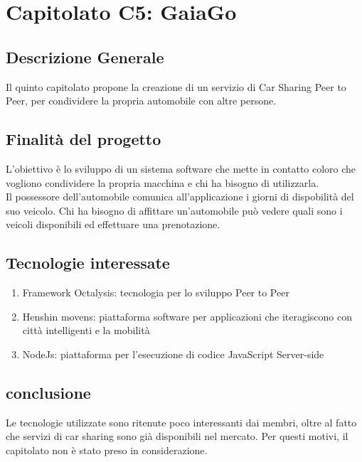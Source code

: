\chapter{Capitolato C5: GaiaGo}
\section{Descrizione Generale}

Il quinto capitolato propone la creazione di un servizio di Car Sharing Peer to Peer, per condividere la propria automobile con altre persone.\\


\section{Finalit\`a del progetto}
L'obiettivo è lo sviluppo di un sistema software che mette in contatto coloro che vogliono condividere la propria macchina e chi ha bisogno di utilizzarla.\\
Il possessore dell'automobile comunica all'applicazione i giorni di dispobilit\`a del suo veicolo.
Chi ha bisogno di affittare un'automobile può vedere quali sono i veicoli disponibili ed effettuare una prenotazione.

\section{Tecnologie interessate}
\begin{enumerate}
\item Framework Octalysis: tecnologia per lo sviluppo Peer to Peer
\item Henshin movens: piattaforma software per applicazioni che iteragiscono con città intelligenti e la mobilità
\item NodeJs: piattaforma per l'esecuzione di codice JavaScript Server-side
\end{enumerate}
\section{conclusione}
Le tecnologie utilizzate sono ritenute poco interessanti dai membri, oltre al fatto che servizi di car sharing sono già disponibili nel mercato. Per questi motivi, il capitolato non è stato preso in considerazione. 